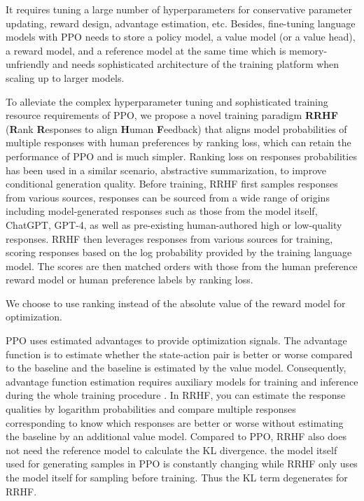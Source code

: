 It requires tuning a large number of hyperparameters for conservative parameter updating, reward design, advantage estimation, etc. Besides, fine-tuning language models with PPO needs to store a policy model, a value model (or a value head), a reward model, and a reference model at the same time which is memory-unfriendly and needs sophisticated architecture of the training platform when scaling up to larger models. 

To alleviate the complex hyperparameter tuning and sophisticated training resource requirements of PPO, we propose a novel training paradigm \textbf{RRHF} (\textbf{R}ank \textbf{R}esponses to align \textbf{H}uman \textbf{F}eedback) that aligns model probabilities of multiple responses with human preferences by ranking loss, which can retain the performance of PPO and is much simpler. Ranking loss on responses probabilities \citep{liu-etal-2022-brio,zhao2022calibrating} has been used in a similar scenario, abstractive summarization, to improve conditional generation quality. Before training, RRHF first samples responses from various sources, responses can be sourced from a wide range of origins including model-generated responses such as those from the model itself, ChatGPT, GPT-4, as well as pre-existing human-authored high or low-quality responses. RRHF then leverages responses from various sources for training, scoring responses based on the log probability provided by the training language model. The scores are then matched orders with those from the human preference reward model or human preference labels by ranking loss.

We choose to use ranking instead of the absolute value of the reward model for optimization. 

PPO uses estimated advantages to provide optimization signals. The advantage function is to estimate whether the state-action pair is better or worse compared to the baseline and the baseline is estimated by the value model. Consequently, advantage function estimation requires auxiliary models for training and inference during the whole training procedure \cite{ziegler2019fine,instructgpt}. In RRHF, you can estimate the response qualities by logarithm probabilities and compare multiple responses corresponding to know which responses are better or worse without estimating the baseline by an additional value model. Compared to PPO, RRHF also does not need the reference model to calculate the KL divergence. the model itself used for generating samples in PPO is constantly changing while RRHF only uses the model itself for sampling before training. Thus the KL term degenerates for RRHF.

